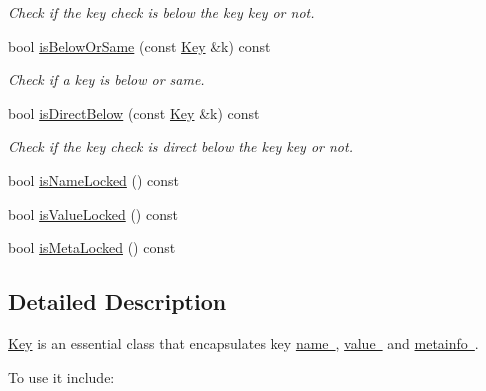 \begin{DoxyCompactItemize}
\begin{DoxyCompactList}\small\item\em Check if the key check is below the key key or not. \end{DoxyCompactList}\item 
bool \mbox{\hyperlink{classkdb_1_1Key_a501eda4871a57faf5f7588a372d8f9c4}{is\+Below\+Or\+Same}} (const \mbox{\hyperlink{classkdb_1_1Key}{Key}} \&k) const
\begin{DoxyCompactList}\small\item\em Check if a key is below or same. \end{DoxyCompactList}\item 
bool \mbox{\hyperlink{classkdb_1_1Key_a6b7ce3736c89225445b7cc49d0e62bbe}{is\+Direct\+Below}} (const \mbox{\hyperlink{classkdb_1_1Key}{Key}} \&k) const
\begin{DoxyCompactList}\small\item\em Check if the key check is direct below the key key or not. \end{DoxyCompactList}\item 
bool \mbox{\hyperlink{classkdb_1_1Key_a2b9d50da6ab7feed47eb5a80f039e91c}{is\+Name\+Locked}} () const
\item 
bool \mbox{\hyperlink{classkdb_1_1Key_a92daf058cb9896c7a926bddeecf179ef}{is\+Value\+Locked}} () const
\item 
bool \mbox{\hyperlink{classkdb_1_1Key_af499cd8c7d664818327c67624f1489e0}{is\+Meta\+Locked}} () const
\end{DoxyCompactItemize}


\subsection{Detailed Description}
\mbox{\hyperlink{classkdb_1_1Key}{Key}} is an essential class that encapsulates key \mbox{\hyperlink{group__keyname}{name }}, \mbox{\hyperlink{group__keyvalue}{value }} and \mbox{\hyperlink{group__keymeta}{metainfo }}. 

To use it include\+: 
\begin{DoxyCode}{0}
\DoxyCodeLine{\textcolor{preprocessor}{\#include <kdb.h>}}
\end{DoxyCode}


